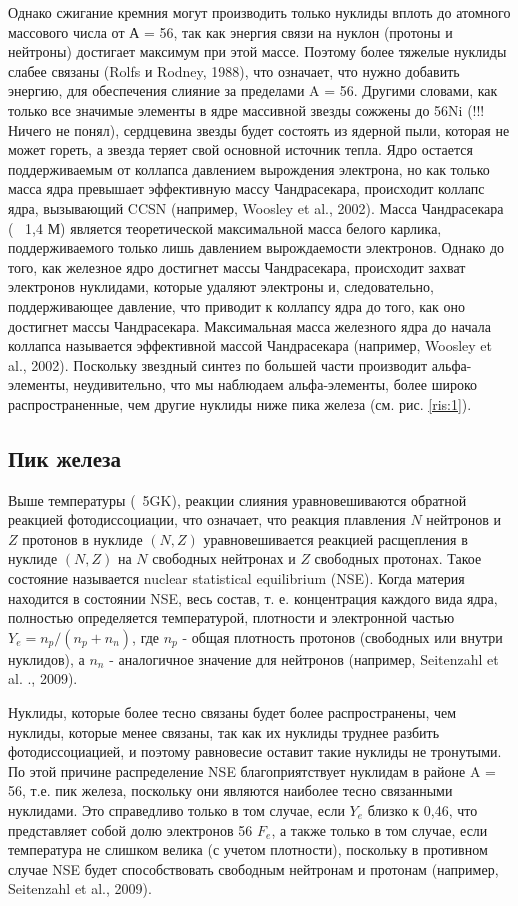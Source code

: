 \documentclass[%
bachelor,    %
natbib,      %
subf,        %
href,        %
colorlinks,  %
]{disser}
\begin{document}
Однако сжигание кремния могут производить только нуклиды вплоть до атомного массового числа от А = 56, так как энергия связи на нуклон (протоны и нейтроны) достигает максимум при этой массе. Поэтому более тяжелые нуклиды слабее связаны (Rolfs и Rodney, 1988), что означает, что нужно добавить энергию, для обеспечения слияние за пределами A = 56. Другими словами, как только все значимые элементы в ядре массивной звезды сожжены до 56Ni (!!!Ничего не понял), сердцевина звезды будет состоять из ядерной пыли, которая не может гореть, а звезда теряет свой основной источник тепла. Ядро остается поддерживаемым от коллапса давлением вырождения электрона, но как только масса ядра превышает эффективную массу Чандрасекара, происходит коллапс ядра, вызывающий CCSN (например, Woosley et al., 2002). Масса Чандрасекара (~ 1,4 М) является теоретической максимальной масса белого карлика, поддерживаемого только лишь давлением вырождаемости электронов. Однако до того, как железное ядро достигнет массы Чандрасекара, происходит захват электронов нуклидами, которые удаляют электроны и, следовательно, поддерживающее давление, что приводит к коллапсу ядра до того, как оно достигнет массы Чандрасекара. Максимальная масса железного ядра до начала коллапса называется эффективной массой Чандрасекара (например, Woosley et al., 2002). Поскольку звездный синтез по большей части производит альфа-элементы, неудивительно, что мы наблюдаем альфа-элементы, более широко распространенные, чем другие нуклиды ниже пика железа (см. рис. \ref{ris:1}).

\subsection{Пик железа}
Выше температуры (~5GK), реакции слияния уравновешиваются обратной реакцией
фотодиссоциации, что означает, что реакция плавления $N$
нейтронов и $Z$ протонов в нуклиде $(N, Z)$ уравновешивается реакцией расщепления в нуклиде $(N, Z)$ на $N$ свободных нейтронах и $Z$ свободных протонах. Такое состояние называется nuclear statistical equilibrium (NSE). Когда материя находится в состоянии NSE, весь состав, т. е. концентрация каждого вида ядра, полностью определяется температурой, плотности и электронной частью $Y_e = n_p/(n_p + n_n)$, где $n_p$ - общая плотность протонов (свободных или внутри нуклидов), а $n_n$ - аналогичное значение для нейтронов (например, Seitenzahl et al. ., 2009).

Нуклиды, которые более тесно связаны будет более распространены, чем нуклиды, которые менее связаны, так как их нуклиды труднее разбить фотодиссоциацией, и поэтому равновесие оставит такие нуклиды не тронутыми. По этой причине распределение NSE благоприятствует нуклидам в районе A = 56, т.е. пик железа, поскольку они являются наиболее тесно связанными нуклидами. Это справедливо только в том случае, если $Y_e$ близко к 0,46, что представляет собой долю электронов 56 $F_e$, а также только в том случае, если температура не слишком велика (с учетом плотности), поскольку в противном случае NSE будет способствовать свободным нейтронам и протонам (например, Seitenzahl et al., 2009).
\end{document}
